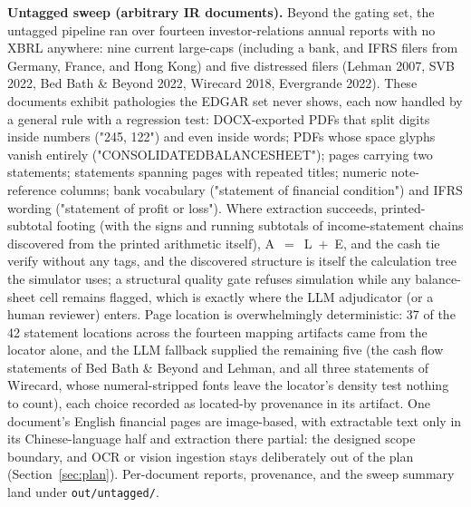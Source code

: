 \documentclass[11pt]{article}
\newcommand{\lead}[2]{\par\addvspace{5pt}\textbf{\textcolor{#1}{#2}}}
\begin{document}
\lead{navytwo}{Untagged sweep (arbitrary IR documents).} Beyond the gating set, the untagged pipeline ran over fourteen investor-relations annual reports with no XBRL anywhere: nine current large-caps (including a bank, and IFRS filers from Germany, France, and Hong Kong) and five distressed filers (Lehman 2007, SVB 2022, Bed Bath \& Beyond 2022, Wirecard 2018, Evergrande 2022). These documents exhibit pathologies the EDGAR set never shows, each now handled by a general rule with a regression test: DOCX-exported PDFs that split digits inside numbers ("245, 122") and even inside words; PDFs whose space glyphs vanish entirely ("CONSOLIDATEDBALANCESHEET"); pages carrying two statements; statements spanning pages with repeated titles; numeric note-reference columns; bank vocabulary ("statement of financial condition") and IFRS wording ("statement of profit or loss"). Where extraction succeeds, printed-subtotal footing (with the signs and running subtotals of income-statement chains discovered from the printed arithmetic itself), A~$=$~L~$+$~E, and the cash tie verify without any tags, and the discovered structure is itself the calculation tree the simulator uses; a structural quality gate refuses simulation while any balance-sheet cell remains flagged, which is exactly where the LLM adjudicator (or a human reviewer) enters. Page location is overwhelmingly deterministic: 37 of the 42 statement locations across the fourteen mapping artifacts came from the locator alone, and the LLM fallback supplied the remaining five (the cash flow statements of Bed Bath \& Beyond and Lehman, and all three statements of Wirecard, whose numeral-stripped fonts leave the locator's density test nothing to count), each choice recorded as located-by provenance in its artifact. One document's English financial pages are image-based, with extractable text only in its Chinese-language half and extraction there partial: the designed scope boundary, and OCR or vision ingestion stays deliberately out of the plan (Section~\ref{sec:plan}). Per-document reports, provenance, and the sweep summary land under \texttt{out/untagged/}.
\end{document}

